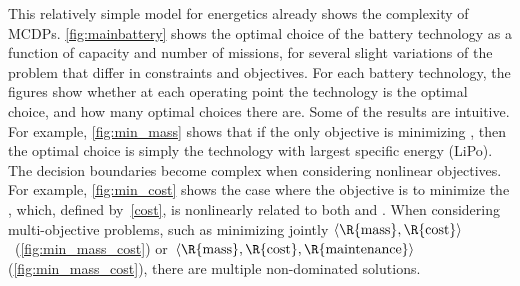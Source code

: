 This relatively simple model for energetics already shows the complexity
of MCDPs. \cref{fig:mainbattery} shows the optimal choice of the battery
technology as a function of capacity and number of missions, for several
slight variations of the problem that differ in constraints and objectives.
For each battery technology, the figures show whether at each operating
point the technology is the optimal choice, and how many optimal choices
there are. Some of the results are intuitive. For example, \cref{fig:min_mass}
shows that if the only objective is minimizing , then the
optimal choice is simply the technology with largest specific energy
(LiPo). The decision boundaries become complex when considering nonlinear
objectives. For example, \cref{fig:min_cost} shows the case where the
objective is to minimize the , which, defined by~\eqref{cost},
is nonlinearly related to both  and .
When considering multi-objective problems, such as minimizing jointly
$\left\langle \R{\text{mass}},\R{\text{cost}}\right\rangle $~(\cref{fig:min_mass_cost})
or~$\left\langle \R{\text{mass}},\R{\text{cost}},\R{\text{maintenance}}\right\rangle $
(\cref{fig:min_mass_cost}), there are multiple non-dominated solutions.

